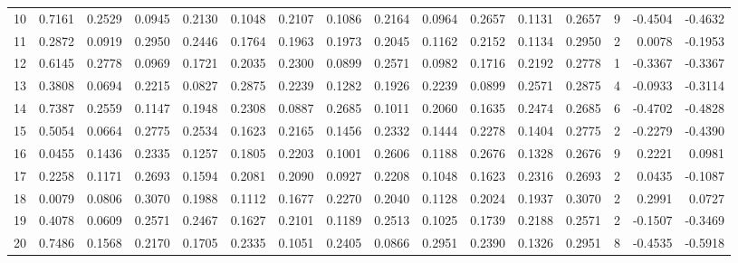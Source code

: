 \begin{tabular}{lrrrrrrrrrrrrrrr}
10  &      0.7161 &  0.2529 &  0.0945 &  0.2130 &  0.1048 &  0.2107 &  0.1086 &  0.2164 &  0.0964 &  0.2657 &   0.1131 &     0.2657 &      9 &                   -0.4504 &                    -0.4632 \\
11  &      0.2872 &  0.0919 &  0.2950 &  0.2446 &  0.1764 &  0.1963 &  0.1973 &  0.2045 &  0.1162 &  0.2152 &   0.1134 &     0.2950 &      2 &                    0.0078 &                    -0.1953 \\
12  &      0.6145 &  0.2778 &  0.0969 &  0.1721 &  0.2035 &  0.2300 &  0.0899 &  0.2571 &  0.0982 &  0.1716 &   0.2192 &     0.2778 &      1 &                   -0.3367 &                    -0.3367 \\
13  &      0.3808 &  0.0694 &  0.2215 &  0.0827 &  0.2875 &  0.2239 &  0.1282 &  0.1926 &  0.2239 &  0.0899 &   0.2571 &     0.2875 &      4 &                   -0.0933 &                    -0.3114 \\
14  &      0.7387 &  0.2559 &  0.1147 &  0.1948 &  0.2308 &  0.0887 &  0.2685 &  0.1011 &  0.2060 &  0.1635 &   0.2474 &     0.2685 &      6 &                   -0.4702 &                    -0.4828 \\
15  &      0.5054 &  0.0664 &  0.2775 &  0.2534 &  0.1623 &  0.2165 &  0.1456 &  0.2332 &  0.1444 &  0.2278 &   0.1404 &     0.2775 &      2 &                   -0.2279 &                    -0.4390 \\
16  &      0.0455 &  0.1436 &  0.2335 &  0.1257 &  0.1805 &  0.2203 &  0.1001 &  0.2606 &  0.1188 &  0.2676 &   0.1328 &     0.2676 &      9 &                    0.2221 &                     0.0981 \\
17  &      0.2258 &  0.1171 &  0.2693 &  0.1594 &  0.2081 &  0.2090 &  0.0927 &  0.2208 &  0.1048 &  0.1623 &   0.2316 &     0.2693 &      2 &                    0.0435 &                    -0.1087 \\
18  &      0.0079 &  0.0806 &  0.3070 &  0.1988 &  0.1112 &  0.1677 &  0.2270 &  0.2040 &  0.1128 &  0.2024 &   0.1937 &     0.3070 &      2 &                    0.2991 &                     0.0727 \\
19  &      0.4078 &  0.0609 &  0.2571 &  0.2467 &  0.1627 &  0.2101 &  0.1189 &  0.2513 &  0.1025 &  0.1739 &   0.2188 &     0.2571 &      2 &                   -0.1507 &                    -0.3469 \\
20  &      0.7486 &  0.1568 &  0.2170 &  0.1705 &  0.2335 &  0.1051 &  0.2405 &  0.0866 &  0.2951 &  0.2390 &   0.1326 &     0.2951 &      8 &                   -0.4535 &                    -0.5918 \\

\end{tabular}
